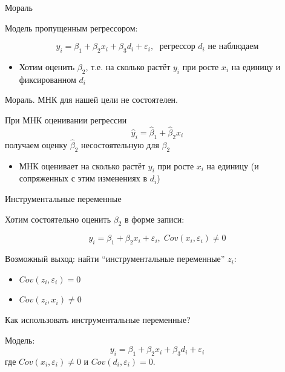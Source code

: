\documentclass[ignorenonframetext,]{beamer}
\newcommand{\e}{\varepsilon}
\begin{document}
\begin{frame}{Мораль}

Модель пропущенным регрессором:

\[
y_i= \beta_1 + \beta_2 x_i + \beta_3 d_i + \varepsilon_i, \; \text{ регрессор } d_i \text{ не наблюдаем}
\]

\begin{itemize}
\itemsep1pt\parskip0pt
\item
  Хотим оценить \(\beta_2\), т.е. на сколько растёт \(y_i\) при росте
  \(x_i\) на единицу и фиксированном \(d_i\)
\end{itemize}

\end{frame}

\begin{frame}{Мораль. МНК для нашей цели не состоятелен.}

При МНК оценивании регрессии \[
\hat{y}_i = \hat{\beta}_1 + \hat{\beta}_2 x_i
\] получаем оценку \(\hat{\beta}_2\) несостоятельную для \(\beta_2\)

\begin{itemize}
\itemsep1pt\parskip0pt
\item
  МНК оценивает на сколько растёт \(y_i\) при росте \(x_i\) на единицу
  (и сопряженных с этим изменениях в \(d_i\))
\end{itemize}

\end{frame}

\begin{frame}{Инструментальные переменные}

Хотим состоятельно оценить \(\beta_2\) в форме записи:

\[
y_i=\beta_1 + \beta_2 x_i + \e_i, \; Cov(x_i,\e_i)\neq 0
\]

Возможный выход: найти ``инструментальные переменные'' \(z_i\):

\begin{itemize}
\item
  \(Cov(z_i, \e_i)=0\)
\item
  \(Cov(z_i, x_i) \neq 0\)
\end{itemize}

\end{frame}

\begin{frame}{Как использовать инструментальные переменные?}

Модель: \[
y_i = \beta_1 + \beta_2 x_i + \beta_3 d_i + \e_i
\] где \(Cov(x_i,\e_i) \neq 0\) и \(Cov(d_i,\e_i)=0\).

\end{frame}
\end{document}
